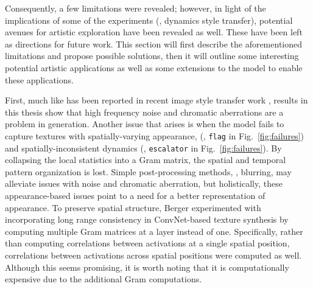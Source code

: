 Consequently, a few limitations were revealed; however, in light of the implications of some of the experiments (\eg, dynamics style transfer), potential avenues for artistic exploration have been revealed as well. These have been left as directions for future work. This section will first describe the aforementioned limitations and propose possible solutions, then it will outline some interesting potential artistic applications as well as some extensions to the model to enable these applications.

First, much like has been reported in recent image style transfer
work \cite{gatys2016image}, results in this thesis show that high frequency
noise and chromatic aberrations are a problem in generation. Another issue that arises is when the model fails to capture
textures with spatially-varying appearance, (\eg, 
\texttt{flag} in Fig.\ \ref{fig:failures}) and
spatially-inconsistent dynamics (\eg, \texttt{escalator} in 
Fig.\ \ref{fig:failures}).
By collapsing the local statistics into a Gram matrix, 
the spatial and temporal pattern organization is lost.
Simple post-processing methods, \eg, blurring, may alleviate issues with noise and chromatic aberration, but holistically, these appearance-based issues point to a need for a better representation of appearance. To preserve spatial structure, Berger \etal \cite{berger2016} experimented with incorporating long range consistency in ConvNet-based texture synthesis by computing multiple Gram matrices at a layer instead of one. Specifically, rather than computing correlations between activations at a single spatial position, correlations between activations across spatial positions were computed as well. Although this  seems promising, it is worth noting that it is computationally expensive due to the additional Gram computations.


